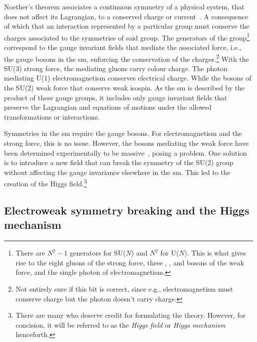 Noether's theorem associates a continuous symmetry of a physical system, that does not affect its Lagrangian, to a conserved charge or current~\cite{Noether_1971}. A consequence of which that an interaction represented by a particular group must conserve the charges associated to the symmetries of said group. The generators of the group\footnote{There are $N^2 - \text{1}$ generators for SU($N$) and $N^2$ for U($N$). This is what gives rise to the eight gluons of the strong force, three \PWplus, \PWminus, and \PZ bosons of the weak force, and the single photon of electromagnetism.} correspond to the gauge invariant fields that mediate the associated force, i.e., the gauge bosons in the \acrshort{sm}, enforcing the conservation of the charges.\footnote{Not entirely sure if this bit is correct, since e.g., electromagnetism must conserve charge but the photon doesn't carry charge.} With the SU(3) strong force, the mediating gluons carry colour charge. The photon \Pphoton mediating U(1) electromagnetism conserves electrical charge. While the bosons of the SU(2) weak force that conserve weak isospin. As the \acrshort{sm} is described by the product of these gauge groups, it includes only gauge invariant fields that preserve the Lagrangian and equations of motions under the allowed transformations or interactions.

Symmetries in the \acrlong{sm} require the gauge bosons. For electromagnetism and the strong force, this is no issue. However, the bosons mediating the weak force have been determined experimentally to be massive~\cite{Arnison:1983mk,Bagnaia:1983zx}, posing a problem. One solution is to introduce a new field that can break the symmetry of the SU(2) group without affecting the gauge invariance elsewhere in the \acrshort{sm}. This led to the creation of the Higgs field.\footnote{There are many who deserve credit for formulating the theory. However, for concision, it will be referred to as the \emph{Higgs field} or \emph{Higgs mechanism} henceforth.}





\subsection{Electroweak symmetry breaking and the Higgs mechanism}
\label{subsec:theory_higgs_mechanism}

